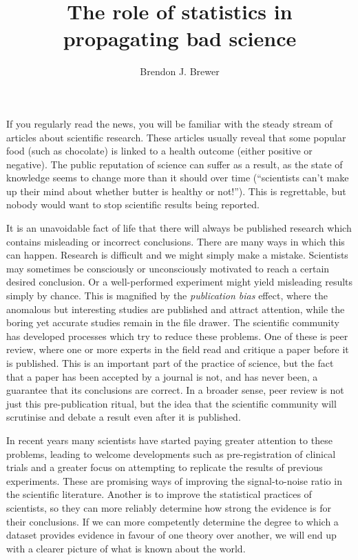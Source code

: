 \documentclass[a4paper, 12pt]{article}
\title{The role of statistics in propagating bad science}
\author{Brendon J. Brewer}
\begin{document}
\sffamily
\maketitle

If you regularly read the news, you will be familiar with the steady stream of
articles about scientific research. These articles usually reveal that some
popular food (such as chocolate)
is linked to a health outcome (either positive or negative).
The public reputation of science can suffer as
a result, as the state of knowledge seems to change more than it should
over time (``scientists can't make up their mind about whether butter is
healthy or not!''). This is regrettable,
but nobody would want to stop scientific results being reported.

It is an unavoidable fact of life that there will always be
published research which contains misleading or incorrect conclusions.
There are many ways in which this can happen. Research is difficult and we
might simply make a mistake.
Scientists may sometimes be consciously or
unconsciously motivated to reach a certain desired conclusion.
Or a well-performed experiment might yield
misleading results simply by chance. This is magnified by the
{\em publication bias} effect, where the anomalous but interesting studies
are published and attract attention, while the boring yet accurate studies
remain in the file drawer.
The scientific community has developed processes which try to reduce these
problems. One of these is peer review, where one or more experts in the field
read and critique a paper before it is published.
This is an important part of the practice of
science, but the fact that a paper has been accepted by a journal
is not, and has never been, a guarantee that its conclusions are correct.
In a broader sense, peer review is not just this pre-publication ritual, but
the idea that the scientific community will scrutinise and debate a result
even after it is published.

In recent years many scientists have
started paying greater attention to these problems, leading to welcome
developments such as pre-registration of clinical trials and
a greater focus on attempting to replicate the results of previous
experiments. These are promising ways of improving the signal-to-noise
ratio in the scientific literature. Another is to improve the statistical
practices of scientists, so they can more reliably determine how strong the
evidence is for their conclusions. If we can more competently determine
the degree to which a dataset provides evidence in favour of one theory over
another, we will end up with a clearer picture of what is known about the
world.
\end{document}
